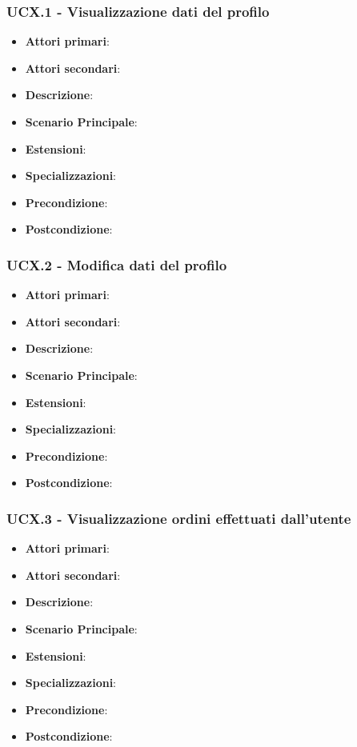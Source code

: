 \subsubsection{UCX.1 - Visualizzazione dati del profilo}
\begin{itemize}
\item \textbf{Attori primari}:
\item \textbf{Attori secondari}:
\item \textbf{Descrizione}:
\item \textbf{Scenario Principale}:
\item \textbf{Estensioni}:
\item \textbf{Specializzazioni}:
\item \textbf{Precondizione}:
\item \textbf{Postcondizione}:
\end{itemize}

\subsubsection{UCX.2 - Modifica dati del profilo}
\begin{itemize}
\item \textbf{Attori primari}:
\item \textbf{Attori secondari}:
\item \textbf{Descrizione}:
\item \textbf{Scenario Principale}:
\item \textbf{Estensioni}:
\item \textbf{Specializzazioni}:
\item \textbf{Precondizione}:
\item \textbf{Postcondizione}:
\end{itemize}

\subsubsection{UCX.3 - Visualizzazione ordini effettuati dall'utente}
\begin{itemize}
\item \textbf{Attori primari}:
\item \textbf{Attori secondari}:
\item \textbf{Descrizione}:
\item \textbf{Scenario Principale}:
\item \textbf{Estensioni}:
\item \textbf{Specializzazioni}:
\item \textbf{Precondizione}:
\item \textbf{Postcondizione}:
\end{itemize}

